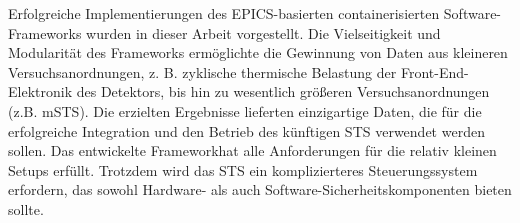 Erfolgreiche Implementierungen des EPICS-basierten containerisierten Software-Frameworks wurden in dieser Arbeit vorgestellt. Die Vielseitigkeit und Modularität des Frameworks ermöglichte die Gewinnung von Daten aus kleineren Versuchsanordnungen, z. B. zyklische thermische Belastung der Front-End-Elektronik des Detektors, bis hin zu wesentlich größeren Versuchsanordnungen (z.B. \gls{mSTS}). Die erzielten Ergebnisse lieferten einzigartige Daten, die für die erfolgreiche Integration und den Betrieb des künftigen \gls{STS} verwendet werden sollen. Das entwickelte Frameworkhat alle Anforderungen für die relativ kleinen Setups erfüllt. Trotzdem wird das STS ein komplizierteres Steuerungssystem erfordern, das sowohl Hardware- als auch Software-Sicherheitskomponenten bieten sollte. 

